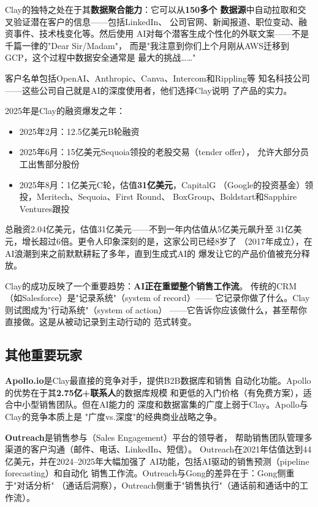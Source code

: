 Clay的独特之处在于其\textbf{数据聚合能力}：它可以从\textbf{150多个
数据源}中自动拉取和交叉验证潜在客户的信息——包括LinkedIn、
公司官网、新闻报道、职位变动、融资事件、技术栈变化等。然后使用
AI对每个潜客生成个性化的外联文案——不是千篇一律的"Dear Sir/Madam"，
而是"我注意到你们上个月刚从AWS迁移到GCP，这个过程中数据安全通常是
最大的挑战……"

客户名单包括OpenAI、Anthropic、Canva、Intercom和Rippling等
知名科技公司——这些公司自己就是AI的深度使用者，他们选择Clay说明
了产品的实力。

2025年是Clay的融资爆发之年：

\begin{itemize}
  \item 2025年2月：12.5亿美元B轮融资
  \item 2025年6月：15亿美元Sequoia领投的老股交易（tender offer），
    允许大部分员工出售部分股份
  \item 2025年8月：1亿美元C轮，估值\textbf{31亿美元}，CapitalG
    （Google的投资基金）领投，Meritech、Sequoia、First Round、
    BoxGroup、Boldstart和Sapphire Ventures跟投
\end{itemize}

总融资2.04亿美元，估值31亿美元——不到一年内估值从5亿美元飙升至
31亿美元，增长超过6倍。更令人印象深刻的是，这家公司已经8岁了
（2017年成立），在AI浪潮到来之前默默耕耘了多年，直到生成式AI的
爆发让它的产品价值被充分释放。

Clay的成功反映了一个重要趋势：\textbf{AI正在重塑整个销售工作流}。
传统的CRM（如Salesforce）是"记录系统"（system of record）——
它记录你做了什么。Clay则试图成为"行动系统"（system of action）
——它告诉你应该做什么，甚至帮你直接做。这是从被动记录到主动行动的
范式转变。

\subsection{其他重要玩家}
\label{subsec:sales-others}

\textbf{Apollo.io}是Clay最直接的竞争对手，提供B2B数据库和销售
自动化功能。Apollo的优势在于其\textbf{2.75亿+联系人}的数据库规模
和更低的入门价格（有免费方案），适合中小型销售团队。但在AI能力的
深度和数据富集的广度上弱于Clay。Apollo与Clay的竞争本质上是
"广度vs.深度"的经典商业战略之争。

\textbf{Outreach}是销售参与（Sales Engagement）平台的领导者，
帮助销售团队管理多渠道的客户沟通（邮件、电话、LinkedIn、短信）。
Outreach在2021年估值达到44亿美元，并在2024--2025年大幅加强了
AI功能，包括AI驱动的销售预测（pipeline forecasting）和自动化
销售工作流。Outreach与Gong的差异在于：Gong侧重于"对话分析"
（通话后洞察），Outreach侧重于"销售执行"（通话前和通话中的工作流）。

